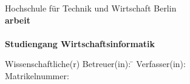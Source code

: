 \begin{titlepage}
\vspace{1em}
\begin{center}
	{\textsf{\large Hochschule für Technik und Wirtschaft Berlin}}\\[4em]
	{\textsf{\textbf{\large{\DieArtDerArbeit}arbeit}}}\\[6mm]
	{\textsf{\textbf{\Large{}\DerTitelDerArbeit}}} \\[1.5cm]
	{\textsf{\textbf{\large{}Studiengang Wirtschaftsinformatik}}\\[6mm]}\vspace{10em}
	
	\begin{minipage}{\textwidth}
		\begin{tabbing}
		Wissenschaftliche(r) Betreuer(in): \hspace{0.85cm}\=\kill
		Verfasser(in): \> \DerAutorDerArbeit \\[1.5mm]
		Matrikelnummer: \> \DieMatrikelnummer \\[1.5mm]
		\end{tabbing}
	\end{minipage}
\end{center}
\end{titlepage}